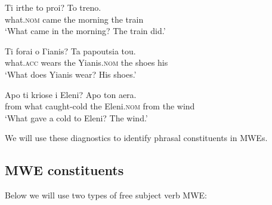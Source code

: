 \documentclass[output=paper]{langsci/langscibook}
\begin{document}
\ea%
    \label{ex:7:17}
\gll  Ti irthe to proi? To treno.\\
             what.\textsc{nom} came the morning the train\\
\glt        `What came in the morning? The train did.'
\z

\ea%
    \label{ex:7:18}
\gll  Ti  forai  o Γianis? Ta papoutsia tou.\\
            what.\textsc{acc}  wears the Yianis.\textsc{nom} the shoes his\\
\glt       `What does Yianis wear? His shoes.'
\z

\ea%
    \label{ex:7:19}
\gll Apo ti kriose i Eleni? Apo ton aera.\\
           from what caught-cold the Eleni.\textsc{nom} from the wind\\
\glt       `What gave a cold to Eleni? The wind.'
\z

We will use these diagnostics to identify phrasal constituents in MWEs. 


\subsection{MWE constituents}

Below we will use two types of free subject verb MWE:
\end{document}
